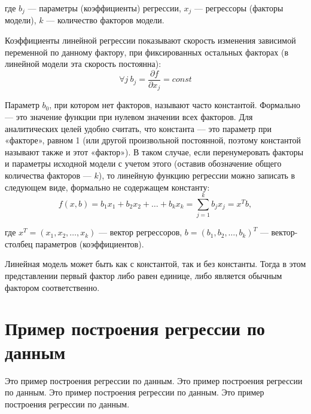 \documentclass[oneside,a4paper,final,14pt]{article}
\begin{document}
где $b_j$ — параметры (коэффициенты) регрессии, $x_j$ — регрессоры (факторы модели), $k$ — количество факторов модели.

Коэффициенты линейной регрессии показывают скорость изменения зависимой переменной по данному фактору, при фиксированных остальных факторах (в линейной модели эта скорость постоянна):
\begin{equation}
\forall j ~b_j=\frac {\partial f}{\partial x_j}=const
\end{equation}

Параметр $b_0$, при котором нет факторов, называют часто константой. Формально — это значение функции при нулевом значении всех факторов. Для аналитических целей удобно считать, что константа — это параметр при «факторе», равном 1 (или другой произвольной постоянной, поэтому константой называют также и этот «фактор»). В таком случае, если перенумеровать факторы и параметры исходной модели с учетом этого (оставив обозначение общего количества факторов — $k$), то линейную функцию регрессии можно записать в следующем виде, формально не содержащем константу:
$$f(x,b)=b_1 x_1 + b_2 x_2 + \ldots + b_k x_k=\sum^k_{j=1}b_j x_j=x^Tb,$$

где $x^T=(x_1,x_2,\ldots,x_k)$ — вектор регрессоров, $b=(b_1,b_2, \ldots,b_k)^T$ — вектор-столбец параметров (коэффициентов).

Линейная модель может быть как с константой, так и без константы. Тогда в этом представлении первый фактор либо равен единице, либо является обычным фактором соответственно.

\newpage

\section{Пример построения регрессии по данным}

Это пример построения регрессии по данным. Это пример построения регрессии по данным. Это пример построения регрессии по данным. Это пример построения регрессии по данным.

\end{document}
